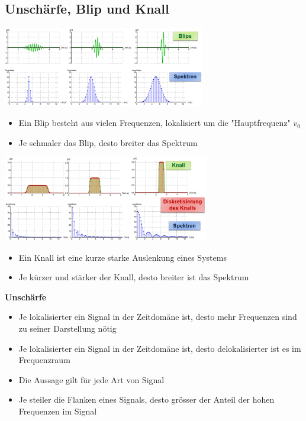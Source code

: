\documentclass[8pt,a4paper]{scrartcl}
\begin{document}
\begin{multicols*}{3}
						\subsection{Unschärfe, Blip und Knall}		
							\includegraphics[height=3.5cm]{img/blip.png} 
							\begin{itemize}\itemsep0pt
								\item Ein Blip besteht aus vielen Frequenzen, lokalisiert um die "Hauptfrequenz" $v_{0}$
								\item Je schmaler das Blip, desto breiter das Spektrum
							\end{itemize}	
							
							\includegraphics[height=3.75cm]{img/knall.png} 
							\begin{itemize}\itemsep0pt
								\item Ein Knall ist eine kurze starke Auslenkung eines Systems
								\item Je kürzer und stärker der Knall, desto breiter ist das Spektrum
							\end{itemize}	
							
							\textbf{Unschärfe}
							\begin{itemize}\itemsep0pt
								\item Je lokalisierter ein Signal in der Zeitdomäne ist, desto mehr Frequenzen sind zu seiner Darstellung nötig
								\item Je lokalisierter ein Signal in der Zeitdomäne ist, desto delokalisierter ist es im Frequenzraum
								\item Die Aussage gilt für jede Art von Signal
								\item Je steiler die Flanken eines Signals, desto grösser der Anteil der hohen Frequenzen im Signal
							\end{itemize}	
							

\end{multicols*}
\end{document}
